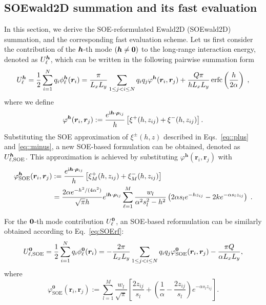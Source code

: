 \subsection{SOEwald2D summation and its fast evaluation}\label{subsec::reforEwald2}
In this section, we derive the SOE-reformulated Ewald2D (SOEwald2D) summation, and the corresponding fast evaluation scheme. 
Let us first consider the contribution of the $\boldsymbol{h}$-th mode $(\boldsymbol{h} \neq \boldsymbol{0})$ to the long-range interaction energy, denoted as $U_{\ell}^{\boldsymbol{h}}$, which can be written in the following pairwise summation form 
\begin{equation}\label{eq::pairssum8}
	\begin{split}
		U_{\ell}^{\boldsymbol{h}} = \frac{1}{2} \sum_{i = 1}^N q_{i} \phi^{\boldsymbol{h}}_\ell(\boldsymbol{r}_{i}) =\frac{\pi}{L_xL_y}\sum_{1\leq j<i\leq N}q_{i}q_{j} \varphi^{\bm{h}} (\bm{r}_{i},\bm{r}_{j}) + \frac{Q \pi}{h L_x L_y} \operatorname{erfc}\left(\frac{h}{2 \alpha}\right)\;,
	\end{split}
\end{equation}
where we define
\begin{equation}\label{eq:varphi_k}
	\varphi^{\bm{h}}(\bm{r}_{i},\bm{r}_{j}):=\frac{e^{\mathrm{i} \boldsymbol{h} \cdot \boldsymbol{\rho}_{ij}}}{h} \left[\xi^{+}(h, z_{ij})+\xi^{-}(h, z_{ij})\right].
\end{equation}
Substituting the SOE approximation of $\xi^{\pm}(h,z)$ described in Eqs.~\eqref{eq::plus} and \eqref{eq::minus}, a new SOE-based formulation can be obtained, denoted as $U_{\ell,\text{SOE}}^{\boldsymbol{h}}$. 
This approximation is achieved by substituting $\varphi^{\bm{h}}(\bm{r}_{i},\bm{r}_{j})$ with
\begin{equation}\label{eq::SOEphi}
	\begin{split}
		\varphi^{\bm{h}}_{\text{SOE}}(\bm{r}_{i},\bm{r}_{j}) & := \frac{e^{\mathrm{i} \boldsymbol{h} \cdot \boldsymbol{\rho}_{ij}}}{h} \left[\xi^{+}_M(h, z_{ij})+\xi^{-}_M(h, z_{ij})\right]\\
		&=\frac{2\alpha e^{-h^2/(4\alpha^2)}}{\sqrt{\pi}h}e^{\mathrm{i}\boldsymbol{h} \cdot \boldsymbol{\rho}_{ij}} \sum_{\ell = 1}^{M}  \frac{w_l}{\alpha^2 s_l^2 - h^2}\left( 2 \alpha s_l e^{-h z_{ij}} - 2ke^{-\alpha s_l z_{ij}}\right) \;.
	\end{split}
\end{equation}

For the $\boldsymbol{0}$-th mode contribution $U_{\ell}^{\boldsymbol{0}}$, an SOE-based reformulation can be similarly obtained according to Eq.~\eqref{eq:SOErf}:
\begin{equation}\label{eq::Ul0SOE}
	U_{\ell,\text{SOE}}^{\bm{0}} = \frac{1}{2} \sum_{i = 1}^N q_{i} \phi^{\bm{0}}_\ell(\boldsymbol{r}_{i}) = - \frac{2\pi}{L_xL_y}\sum_{1\leq j < i \leq N}q_{i}q_{j}\varphi^{\bm{0}}_{\text{SOE}}(\bm{r}_{i},\bm{r}_{j})-\frac{\pi Q}{\alpha L_xL_y},
\end{equation}
where
\begin{equation}\label{eq::32}
	\varphi^{\bm{0}}_{\text{SOE}}(\bm{r}_{i},\bm{r}_{j}):=\sum_{l=1}^{M}\frac{w_l}{\sqrt{\pi}}\left[\frac{2z_{ij}}{s_l}+\left(\frac{1}{\alpha}-\frac{2z_{ij}}{s_l}\right)e^{-\alpha s_l z_{ij}}\right].
\end{equation}

